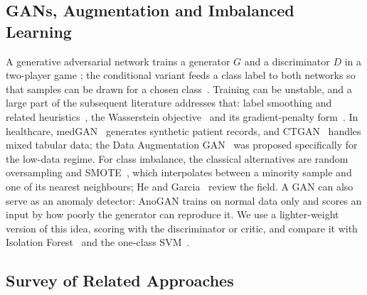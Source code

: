 \documentclass[conference]{IEEEtran}
\begin{document}
\subsection{GANs, Augmentation and Imbalanced Learning}

A generative adversarial network trains a generator $G$ and a discriminator $D$ in a two-player game
\cite{goodfellow2014}; the conditional variant feeds a class label to both networks so that samples can be drawn for a
chosen class~\cite{mirza2014}. Training can be unstable, and a large part of the subsequent literature addresses
that: label smoothing and related heuristics~\cite{salimans2016}, the Wasserstein objective~\cite{arjovsky2017} and
its gradient-penalty form~\cite{gulrajani2017}. In healthcare, medGAN~\cite{choi2017} generates synthetic patient
records, and CTGAN~\cite{xu2019} handles mixed tabular data; the Data Augmentation GAN~\cite{antoniou2017} was
proposed specifically for the low-data regime. For class imbalance, the classical alternatives are random
oversampling and SMOTE~\cite{chawla2002}, which interpolates between a minority sample and one of its nearest
neighbours; He and Garcia~\cite{he2009} review the field. A GAN can also serve as an anomaly detector: AnoGAN
\cite{schlegl2017} trains on normal data only and scores an input by how poorly the generator can reproduce it. We use
a lighter-weight version of this idea, scoring with the discriminator or critic, and compare it with Isolation
Forest~\cite{liu2008} and the one-class SVM~\cite{scholkopf2001}.

\subsection{Survey of Related Approaches}
\end{document}

